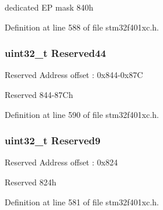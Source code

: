 dedicated EP mask 840h 

Definition at line 588 of file stm32f401xc.\+h.

\subsubsection[{\texorpdfstring{Reserved44}{Reserved44}}]{\setlength{\rightskip}{0pt plus 5cm}uint32\+\_\+t Reserved44}\hypertarget{struct_u_s_b___o_t_g___device_type_def_a7a7dbcc0da59081fc6c8af59ab613520}{}\label{struct_u_s_b___o_t_g___device_type_def_a7a7dbcc0da59081fc6c8af59ab613520}
Reserved Address offset \+: 0x844-\/0x87C

Reserved 844-\/87\+Ch 

Definition at line 590 of file stm32f401xc.\+h.

\subsubsection[{\texorpdfstring{Reserved9}{Reserved9}}]{\setlength{\rightskip}{0pt plus 5cm}uint32\+\_\+t Reserved9}\hypertarget{struct_u_s_b___o_t_g___device_type_def_a5dc05e38e6d591cd88f820b7a0b3f727}{}\label{struct_u_s_b___o_t_g___device_type_def_a5dc05e38e6d591cd88f820b7a0b3f727}
Reserved Address offset \+: 0x824

Reserved 824h 

Definition at line 581 of file stm32f401xc.\+h.



